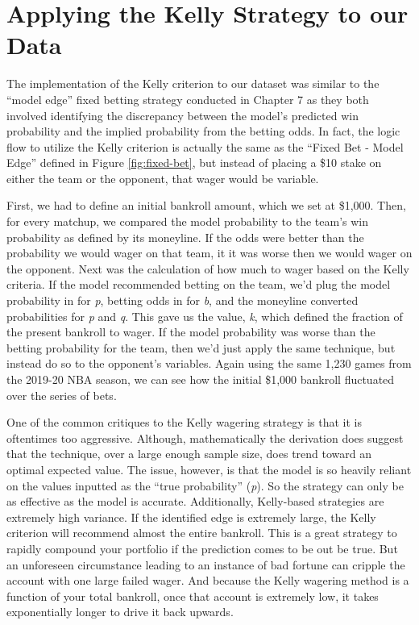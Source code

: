\documentclass [MS] {uclathes}
\begin{document}
\section{Applying the Kelly Strategy to our Data}

The implementation of the Kelly criterion to our dataset was similar to the ``model edge'' fixed betting strategy conducted in Chapter 7 as they both involved identifying the discrepancy between the model's predicted win probability and the implied probability from the betting odds. In fact, the logic flow to utilize the Kelly criterion is actually the same as the ``Fixed Bet - Model Edge'' defined in Figure \ref{fig:fixed-bet}, but instead of placing a \$10 stake on either the team or the opponent, that wager would be variable. 

First, we had to define an initial bankroll amount, which we set at \$1,000. Then, for every matchup, we compared the model probability to the team's win probability as defined by its moneyline. If the odds were better than the probability we would wager on that team, it it was worse then we would wager on the opponent. Next was the calculation of how much to wager based on the Kelly criteria. If the model recommended betting on the team, we'd plug the model probability in for \emph{p}, betting odds in for \emph{b}, and the moneyline converted probabilities for \emph{p} and \emph{q}. This gave us the value, \emph{k}, which defined the fraction of the present bankroll to wager. If the model probability was worse than the betting probability for the team, then we'd just apply the same technique, but instead do so to the opponent's variables. Again using the same 1,230 games from the 2019-20 NBA season, we can see how the initial \$1,000 bankroll fluctuated over the series of bets.

One of the common critiques to the Kelly wagering strategy is that it is oftentimes too aggressive. Although, mathematically the derivation does suggest that the technique, over a large enough sample size, does trend toward an optimal expected value. The issue, however, is that the model is so heavily reliant on the values inputted as the ``true probability'' (\emph{p}). So the strategy can only be as effective as the model is accurate. Additionally, Kelly-based strategies are extremely high variance. If the identified edge is extremely large, the Kelly criterion will recommend almost the entire bankroll. This is a great strategy to rapidly compound your portfolio if the prediction comes to be out be true. But an unforeseen circumstance leading to an instance of bad fortune can cripple the account with one large failed wager. And because the Kelly wagering method is a function of your total bankroll, once that account is extremely low, it takes exponentially longer to drive it back upwards.
\end{document}
